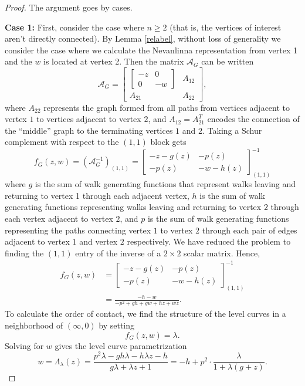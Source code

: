 \documentclass[12pt]{amsart}
\theoremstyle{remark}
\newcommand{\A}{\mathcal{A}}
\newcommand{\inv}{^{-1}}
\newcommand\la{\lambda}
\newcommand\bbm{\begin{bmatrix}}
\newcommand\ebm{\end{bmatrix}}
\numberwithin{equation}{section}
\begin{document}
\begin{proof}
The argument goes by cases.

\textbf{Case 1:} First, consider the case where $n \geq 2$ (that is, the vertices of interest aren't directly connected). By Lemma \ref{relabel}, without loss of generality we consider the case where we calculate the Nevanlinna representation from vertex 1 and the $w$ is located at vertex 2. Then the matrix $\A_G$ can be written
\[
\A_G = \bbm \bbm -z & 0 \\ 0 & -w \ebm & A_{12} \\ A_{21} & A_{22} \ebm,
\]
where $A_{22}$ represents the graph formed from all paths from vertices adjacent to vertex $1$ to vertices adjacent to vertex $2$, and $A_{12} = A_{21}^T$ encodes the connection of the ``middle'' graph to the terminating vertices $1$ and $2$.
Taking a Schur complement with respect to the $(1,1)$ block gets
\[
f_G(z,w) = (\A_G\inv)_{(1,1)} = \bbm -z -g(z) & -p(z) \\ -p(z) & -w - h(z) \ebm\inv_{(1,1)}
\]
where $g$ is the sum of walk generating functions that represent walks leaving and returning to vertex 1 through each adjacent vertex, $h$ is the sum of walk generating functions representing walks leaving and returning to vertex $2$ through each vertex adjacent to vertex $2$, and $p$ is the sum of walk generating functions representing the paths connecting vertex $1$ to vertex $2$ through each pair of edges adjacent to vertex $1$ and vertex $2$ respectively. We have reduced the problem to finding the $(1,1)$ entry of the inverse of a $2 \times 2$ scalar matrix. Hence,
\begin{align*}
f_G(z,w) &= \bbm -z -g(z) & -p(z) \\ -p(z) & -w - h(z) \ebm\inv_{(1,1)} \\
&= \frac{-h-w}{-p^2+g h+g w+h z+w z}.
\end{align*}
To calculate the order of contact, we find the structure of the level curves in a neighborhood of $(\infty, 0)$ by setting $$f_G(z,w) = \la.$$ Solving for $w$ gives the level curve parametrization
\[
w = \Lambda_\la(z) = \frac{p^2 \la-g h \la-h \la z-h}{g \la+\la z+1} = -h + p^2 \cdot \frac{\la}{1 + \la(g + z)}.
\]



\end{proof}
\end{document}
